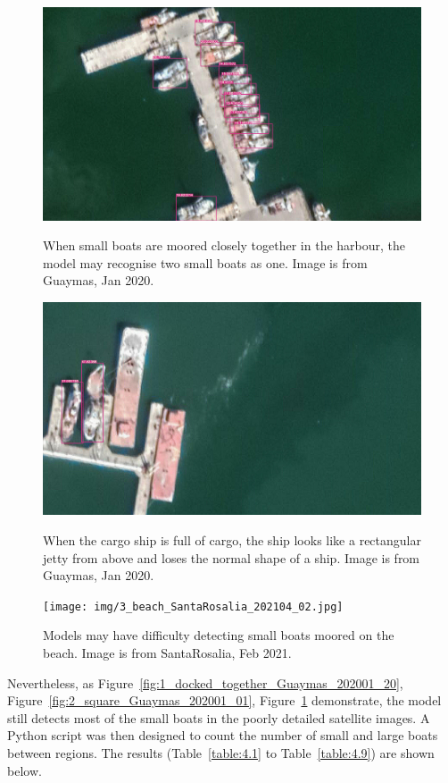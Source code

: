 \begin{figure}[p]
    \centering
    \includegraphics[scale=0.08]{img/1_docked_together_Guaymas_202001_20.jpg}
    \caption{When small boats are moored closely together in the harbour, the model may recognise two small boats as one. Image is from Guaymas, Jan 2020.}
    \label{fig:1_docked_together_Guaymas_202001_20}


    \includegraphics[scale=0.08]{img/2_square_Guaymas_202001_01.jpg}
    \caption{When the cargo ship is full of cargo, the ship looks like a rectangular jetty from above and loses the normal shape of a ship. Image is from Guaymas, Jan 2020.}
    \label{fig:2_square_Guaymas_202001_01}


    \texttt{[image: img/3\_beach\_SantaRosalia\_202104\_02.jpg]}
    \caption{Models may have difficulty detecting small boats moored on the beach. Image is from SantaRosalia, Feb 2021.}
    \label{fig:3_beach_SantaRosalia_202104_02}
\end{figure}

\newpage
Nevertheless, as Figure~\ref{fig:1_docked_together_Guaymas_202001_20}, Figure~\ref{fig:2_square_Guaymas_202001_01}, Figure~\ref{fig:3_beach_SantaRosalia_202104_02} demonstrate, the model still detects most of the small boats in the poorly detailed satellite images. A Python script was then designed to count the number of small and large boats between regions. The results (Table~\ref{table:4.1} to Table~\ref{table:4.9}) are shown below.


